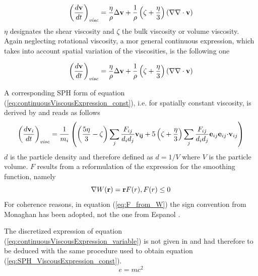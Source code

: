 \documentclass{report}
\begin{document}
\begin{equation}
\label{eq:continuousViscousExpression_const}
\left(\frac{d{\bf v}}{dt}\right)_{\mathit{visc}}=\frac{\eta}{\rho}\Delta {\bf v}+\frac{1}{\rho}\left(\zeta +\frac{\eta}{3}\right)\left(\nabla \nabla \cdot {\bf v}\right)
\end{equation}
$\eta$ designates the shear viscosity and $\zeta$ the bulk viscosity or volume viscosity.
Again neglecting rotational viscosity, a mor general continuous expression, which takes into account spatial variation of the viscosities, is the following one


\begin{equation}
\label{eq:continuousViscousExpression_variable}
\left(\frac{d{\bf v}}{dt}\right)_{\mathit{visc}}=\frac{\eta}{\rho}\Delta {\bf v}+\frac{1}{\rho}\left(\zeta +\frac{\eta}{3}\right)\left(\nabla \nabla \cdot {\bf v}\right)
\end{equation}


A corresponding SPH form of equation (\ref{eq:continuousViscousExpression_const}), i.e. for spatially constant viscosity, is derived by \cite{Espanol2003} and reads as follows
\begin{equation}
\label{eq:SPH_ViscousExpression_const}
\left(\frac{d{\bf v}_i}{dt}\right)_{\mathit{visc}}=\frac{1}{m_i}\left( \left(\frac{5\eta}{3}-\zeta\right)\sum_j\frac{F_{ij}}{d_i d_j}{\bf v_{ij}}+5\left(\zeta+\frac{\eta}{3}\right) \sum_j\frac{F_{ij}}{d_i d_j}{\bf e}_{ij} {\bf e}_{ij}{\bf \cdot v}_{ij}\right)
\end{equation}
$d$ is the particle density and therefore defined as $d=1/V$ where $V$ is the particle volume. $F$ results from a reformulation of the expression for the smoothing function, namely
\begin{equation}
 \label{eq:F_from_W}
\nabla W({\bf r})={\bf r} F(r), F(r)\leq 0
\end{equation}
For coherence reasons, in equation (\ref{eq:F_from_W}) the sign convention from Monaghan \cite{Monaghan2005} has been adopted, not the one from Espanol \cite{Espanol2003}.


The discretized expression of equation (\ref{eq:continuousViscousExpression_variable}) is not given in \cite{Espanol2003} and had therefore to be deduced with the same procedure used to obtain equation (\ref{eq:SPH_ViscousExpression_const}).
\begin{equation}
\label{eq:SPH_ViscousExpression_variable}
e=mc^2
\end{equation}
\end{document}

